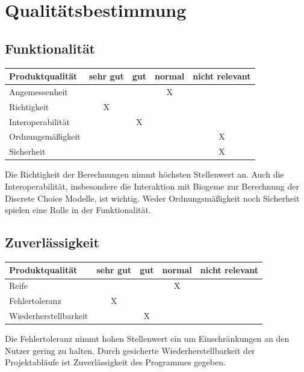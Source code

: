 \documentclass{article}
\begin{document}
\clearpage
\section{Qualitätsbestimmung}
\subsection{Funktionalität}
\begin{table}[H]
\centering
\begin{tabular}{lcccc}
\hline
\textbf{Produktqualität} & sehr gut & gut & normal & nicht relevant \\ \hline
Angemessenheit           &          &     & X      &                \\
Richtigkeit              & X        &     &        &                \\
Interoperabilität        &          & X   &        &                \\
Ordnungsmäßigkeit        &          &     &        & X              \\
Sicherheit               &          &     &        & X              \\  
\end{tabular}
\end{table}
Die Richtigkeit der Berechnungen nimmt höchsten Stellenwert an. Auch die Interoperabilität, insbesondere die Interaktion mit Biogeme zur Berechnung der Discrete Choice Modelle, ist wichtig. Weder Ordnungsmäßigkeit noch Sicherheit spielen eine Rolle in der Funktionalität.

\subsection{Zuverlässigkeit}
\begin{table}[H]
\centering
\begin{tabular}{lcccc}
\hline
\textbf{Produktqualität} & sehr gut & gut & normal & nicht relevant \\ \hline
Reife                    &          &     & X      &                \\
Fehlertoleranz           & X        &     &        &                \\
Wiederherstellbarkeit    &          & X   &        &                \\
\end{tabular}
\end{table}
Die Fehlertoleranz nimmt hohen Stellenwert ein um Einschränkungen an den Nutzer gering zu halten. Durch gesicherte Wiederherstellbarkeit der Projektabläufe ist Zuverlässigkeit des Programmes gegeben. 
\end{document}
